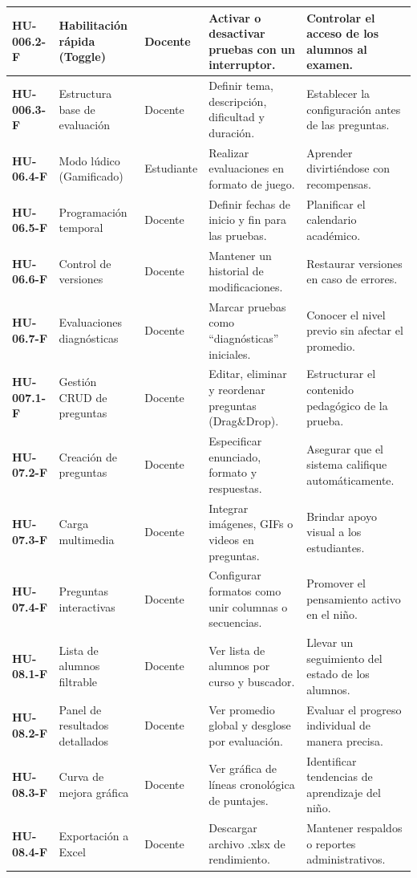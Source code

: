 \begin{small}
\begin{longtable}{|>{\bfseries}p{2.1cm}|p{3.2cm}|p{1.7cm}|p{4cm}|p{3.5cm}|}
HU-006.2-F & Habilitación rápida (Toggle) & Docente & Activar o desactivar pruebas con un interruptor. & Controlar el acceso de los alumnos al examen. \\\hline
HU-006.3-F & Estructura base de evaluación & Docente & Definir tema, descripción, dificultad y duración. & Establecer la configuración antes de las preguntas. \\\hline
HU-06.4-F & Modo lúdico (Gamificado) & Estudiante & Realizar evaluaciones en formato de juego. & Aprender divirtiéndose con recompensas. \\\hline
HU-06.5-F & Programación temporal & Docente & Definir fechas de inicio y fin para las pruebas. & Planificar el calendario académico. \\\hline
HU-06.6-F & Control de versiones & Docente & Mantener un historial de modificaciones. & Restaurar versiones en caso de errores. \\\hline
HU-06.7-F & Evaluaciones diagnósticas & Docente & Marcar pruebas como ``diagnósticas'' iniciales. & Conocer el nivel previo sin afectar el promedio. \\\hline
HU-007.1-F & Gestión CRUD de preguntas & Docente & Editar, eliminar y reordenar preguntas (Drag\&Drop). & Estructurar el contenido pedagógico de la prueba. \\\hline
HU-07.2-F & Creación de preguntas & Docente & Especificar enunciado, formato y respuestas. & Asegurar que el sistema califique automáticamente. \\\hline
HU-07.3-F & Carga multimedia & Docente & Integrar imágenes, GIFs o videos en preguntas. & Brindar apoyo visual a los estudiantes. \\\hline
HU-07.4-F & Preguntas interactivas & Docente & Configurar formatos como unir columnas o secuencias. & Promover el pensamiento activo en el niño. \\\hline
HU-08.1-F & Lista de alumnos filtrable & Docente & Ver lista de alumnos por curso y buscador. & Llevar un seguimiento del estado de los alumnos. \\\hline
HU-08.2-F & Panel de resultados detallados & Docente & Ver promedio global y desglose por evaluación. & Evaluar el progreso individual de manera precisa. \\\hline
HU-08.3-F & Curva de mejora gráfica & Docente & Ver gráfica de líneas cronológica de puntajes. & Identificar tendencias de aprendizaje del niño. \\\hline
HU-08.4-F & Exportación a Excel & Docente & Descargar archivo .xlsx de rendimiento. & Mantener respaldos o reportes administrativos. \\\hline

\end{longtable}
\end{small}
